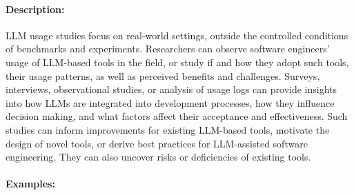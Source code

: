\documentclass[smallextended]{svjour3}
\newcommand{\studytypeparagraph}[1]{\paragraph{\bfseries #1:}}
\newcommand{\studytypeparagraph}[1]{\subsubsection{#1}}
\begin{document}
\studytypeparagraph{Description}

LLM usage studies focus on real-world settings, outside the controlled conditions of benchmarks and experiments.
Researchers can observe software engineers' usage of LLM-based tools in the field, or study if and how they adopt such tools, their usage patterns, as well as perceived benefits and challenges.
Surveys, interviews, observational studies, or analysis of usage logs can provide insights into how LLMs are integrated into development processes, how they influence decision making, and what factors affect their acceptance and effectiveness. 
Such studies can inform improvements for existing LLM-based tools, motivate the design of novel tools, or derive best practices for LLM-assisted software engineering.
They can also uncover risks or deficiencies of existing tools.

\studytypeparagraph{Examples}
\end{document}
